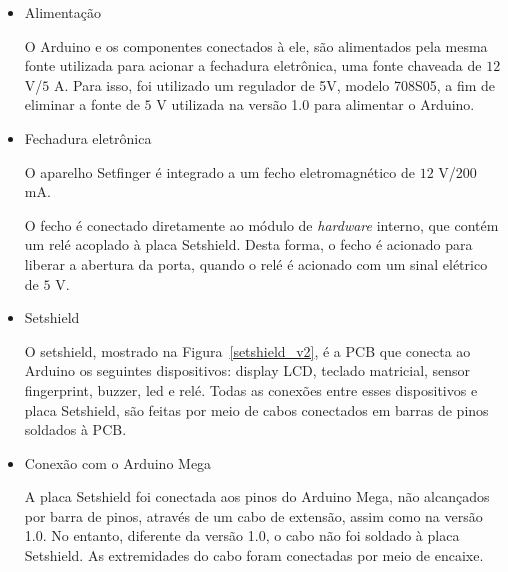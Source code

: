 \begin{itemize}

\item Alimentação

O Arduino e os componentes conectados à ele, são alimentados pela mesma fonte utilizada para acionar a fechadura eletrônica, uma fonte chaveada de $12$ V/$5$ A. Para isso, foi utilizado um regulador de 5V, modelo 708S05, a fim de eliminar a fonte de $5$ V utilizada na versão 1.0 para alimentar o Arduino. 

\item Fechadura eletrônica

O aparelho Setfinger é integrado a um fecho eletromagnético de $12$ V/200 mA. 


O fecho é conectado diretamente ao módulo de \textit{hardware} interno, que contém um relé acoplado à placa Setshield. Desta forma, o fecho é acionado para liberar a abertura da porta, quando o relé é acionado com um sinal elétrico de $5$ V. 

\item Setshield

O setshield, mostrado na Figura~\ref{setshield_v2}, é a PCB que conecta ao Arduino os seguintes dispositivos: display LCD, teclado matricial, sensor fingerprint, buzzer, led e relé. Todas as conexões entre esses dispositivos e placa Setshield, são feitas por meio de cabos conectados em barras de pinos soldados à PCB. 

\item Conexão com o Arduino Mega

A placa Setshield foi conectada aos pinos do Arduino Mega, não alcançados por barra de pinos, através de um cabo de extensão, assim como na versão 1.0. No entanto, diferente da versão 1.0, o cabo não foi soldado à placa Setshield. As extremidades do cabo foram conectadas por meio de encaixe.


\end{itemize}



